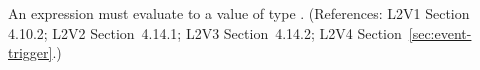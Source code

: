 An \Event {} expression must evaluate to a value of type
.  (References: L2V1 Section 4.10.2; L2V2 Section~4.14.1;
L2V3 Section~4.14.2; L2V4 Section~\ref{sec:event-trigger}.)
